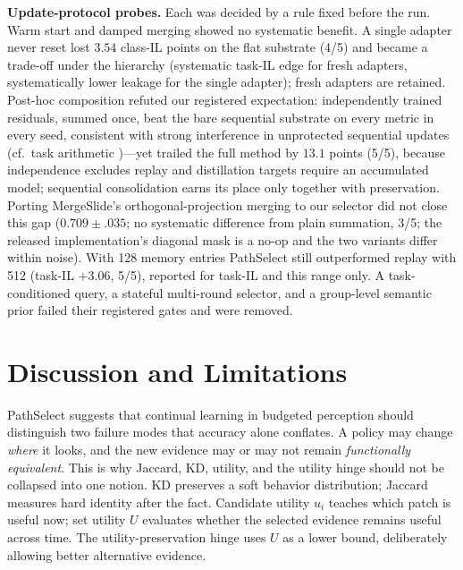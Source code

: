 \documentclass{article}
\begin{document}
\textbf{Update-protocol probes.}
Each was decided by a rule fixed before the run.
Warm start and damped merging showed no systematic benefit.
A single adapter never reset lost $3.54$ class-IL points on the flat substrate (4/5) and became a trade-off under the hierarchy (systematic task-IL edge for fresh adapters, systematically lower leakage for the single adapter); fresh adapters are retained.
Post-hoc composition refuted our registered expectation: independently trained residuals, summed once, beat the bare sequential substrate on every metric in every seed, consistent with strong interference in unprotected sequential updates (cf.\ task arithmetic \cite{ilharco2023task})---yet trailed the full method by $13.1$ points (5/5), because independence excludes replay and distillation targets require an accumulated model; sequential consolidation earns its place only together with preservation.
Porting MergeSlide's orthogonal-projection merging \cite{bui2026mergeslide} to our selector did not close this gap ($0.709{\pm}.035$; no systematic difference from plain summation, 3/5; the released implementation's diagonal mask is a no-op and the two variants differ within noise).
With 128 memory entries PathSelect still outperformed replay with 512 (task-IL $+3.06$, 5/5), reported for task-IL and this range only.
A task-conditioned query, a stateful multi-round selector, and a group-level semantic prior failed their registered gates and were removed.



\FloatBarrier
\section{Discussion and Limitations}
\label{sec:discussion}

PathSelect suggests that continual learning in budgeted perception should distinguish two failure modes that accuracy alone conflates.
A policy may change \emph{where} it looks, and the new evidence may or may not remain \emph{functionally equivalent}.
This is why Jaccard, KD, utility, and the utility hinge should not be collapsed into one notion.
KD preserves a soft behavior distribution; Jaccard measures hard identity after the fact.
Candidate utility $u_i$ teaches which patch is useful now; set utility $U$ evaluates whether the selected evidence remains useful across time.
The utility-preservation hinge uses $U$ as a lower bound, deliberately allowing better alternative evidence.
\end{document}
